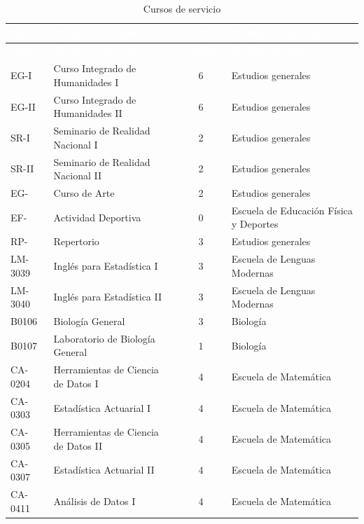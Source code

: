 \begingroup
\small
{}%
\renewcommand{\arraystretch}{1.2}%
%
\begin{longtable}{|l|>{\raggedright\arraybackslash}p{6cm}|c|>{\raggedright\arraybackslash}p{4.2cm}|}
\caption{Cursos de servicio}\label{res:opt-otra}\\
\hline
\rowcolor{Azul-UCR}
\textcolor{white}{\textbf{Sigla}} & \textcolor{white}{\textbf{Nombre del curso}} & \textcolor{white}{\textbf{Créditos}} & \textcolor{white}{\textbf{Unidad académica}} \\ \hline
\endfirsthead
\hline
\rowcolor{Azul-UCR}
\textcolor{white}{\textbf{Sigla}} & \textcolor{white}{\textbf{Nombre del curso}} & \textcolor{white}{\textbf{Créditos}} & \textcolor{white}{\textbf{Unidad académica}} \\ \hline
\endhead
\hline
\endfoot
EG-I & Curso Integrado de Humanidades I  & 6 & Estudios generales \\ \hline
EG-II & Curso Integrado de Humanidades II & 6 & Estudios generales \\ \hline
SR-I & Seminario de Realidad Nacional I & 2 & Estudios generales \\ \hline
SR-II & Seminario de Realidad Nacional II & 2 & Estudios generales \\ \hline
EG- & Curso de Arte & 2 & Estudios generales \\ \hline
EF- & Actividad Deportiva & 0 & Escuela de Educación Física y Deportes \\ \hline
RP- & Repertorio & 3 & Estudios generales \\ \hline
LM-3039 & Inglés para Estadística I & 3 & Escuela de Lenguas Modernas \\ \hline
LM-3040 & Inglés para Estadística II & 3 & Escuela de Lenguas Modernas \\ \hline
B0106 & Biología General & 3 & Biología \\ \hline
B0107 & Laboratorio de Biología General & 1 & Biología \\ \hline
CA-0204 & Herramientas de Ciencia de Datos I & 4 & Escuela de Matemática \\ \hline
CA-0303 & Estadística Actuarial I & 4 & Escuela de Matemática \\ \hline
CA-0305 & Herramientas de Ciencia de Datos II & 4 & Escuela de Matemática \\ \hline
CA-0307 & Estadística Actuarial II & 4 & Escuela de Matemática \\ \hline
CA-0411 & Análisis de Datos I & 4 & Escuela de Matemática \\ \hline

\end{longtable}
